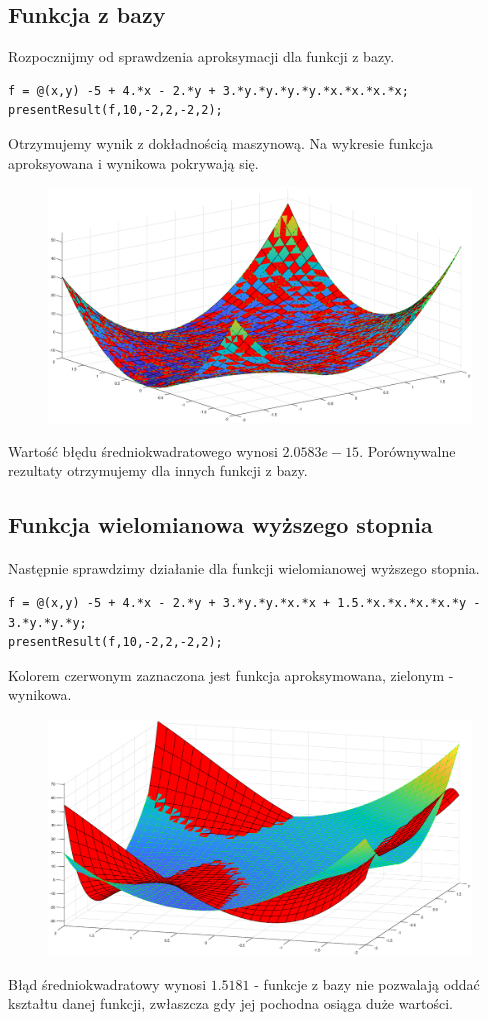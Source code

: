 \documentclass{article}
\begin{document}
\subsection{Funkcja z bazy}
Rozpocznijmy od sprawdzenia aproksymacji dla funkcji z bazy.
\begin{lstlisting}[style=Matlab-editor]
f = @(x,y) -5 + 4.*x - 2.*y + 3.*y.*y.*y.*y.*x.*x.*x.*x;
presentResult(f,10,-2,2,-2,2);
\end{lstlisting}
Otrzymujemy wynik z dokładnością maszynową. Na wykresie funkcja aproksyowana i wynikowa pokrywają się.
\begin{figure}[H]
  \includegraphics[width=\linewidth]{fig1.eps}
\end{figure}
Wartość błędu średniokwadratowego wynosi $2.0583e-15$. Porównywalne rezultaty otrzymujemy dla innych funkcji z bazy.
\subsection{Funkcja wielomianowa wyższego stopnia}
\paragraph{}
Następnie sprawdzimy działanie dla funkcji wielomianowej wyższego stopnia.
\begin{lstlisting}[style=Matlab-editor]
f = @(x,y) -5 + 4.*x - 2.*y + 3.*y.*y.*x.*x + 1.5.*x.*x.*x.*x.*y - 3.*y.*y.*y;
presentResult(f,10,-2,2,-2,2);
\end{lstlisting}
Kolorem czerwonym zaznaczona jest funkcja aproksymowana, zielonym - wynikowa.
\begin{figure}[H]
  \includegraphics[width=\linewidth]{fig2.eps}
\end{figure}
Błąd średniokwadratowy wynosi $1.5181$ - funkcje z bazy nie pozwalają oddać kształtu danej funkcji, zwłaszcza gdy jej pochodna osiąga duże wartości.
\end{document}
